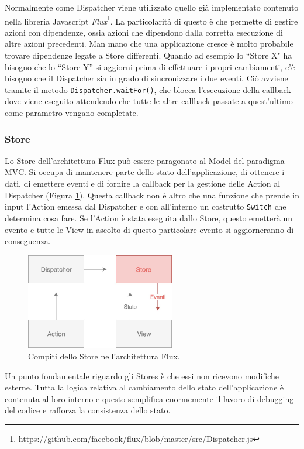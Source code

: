 Normalmente come Dispatcher viene utilizzato quello già implementato contenuto nella libreria Javascript \textit{Flux}\footnote{https://github.com/facebook/flux/blob/master/src/Dispatcher.js}. La particolarità di questo è che permette di gestire azioni con dipendenze, ossia azioni che dipendono dalla corretta esecuzione di altre azioni precedenti. Man mano che una applicazione cresce è molto probabile trovare dipendenze legate a Store differenti. Quando ad esempio lo “Store X" ha bisogno che lo “Store Y” si aggiorni prima di effettuare i propri cambiamenti, c'è bisogno che il Dispatcher sia in grado di sincronizzare i due eventi. Ciò avviene tramite il metodo \texttt{Dispatcher.waitFor()}, che blocca l'esecuzione della callback dove viene eseguito attendendo che tutte le altre callback passate a quest'ultimo come parametro vengano completate.

\subsubsection*{Store}
Lo Store dell'architettura Flux può essere paragonato al Model del paradigma MVC. Si occupa di mantenere parte dello stato dell'applicazione, di ottenere i dati, di emettere eventi e di fornire la callback per la gestione delle Action al Dispatcher (Figura \ref{StoreWorkflow}). Questa callback non è altro che una funzione che prende in input l'Action emessa dal Dispatcher e con all'interno un costrutto \texttt{Switch} che determina cosa fare. Se l'Action è stata eseguita dallo Store, questo emetterà un evento e tutte le View in ascolto di questo particolare evento si aggiorneranno di conseguenza.

\begin{figure}[h]
\centering
\vspace*{0.5cm} 
\includegraphics[width=6.5cm]{./images/StoreWorkflow}
\caption{Compiti dello Store nell'architettura Flux.}
\label{StoreWorkflow}
\vspace*{0.5cm} 
\end{figure}

Un punto fondamentale riguardo gli Stores è che essi non ricevono modifiche esterne. Tutta la logica relativa al cambiamento dello stato dell'applicazione è contenuta al loro interno e questo semplifica enormemente il lavoro di debugging del codice e rafforza la consistenza dello stato.

